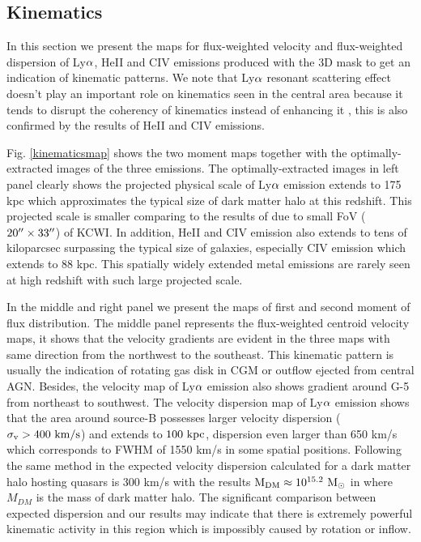 \subsection{Kinematics}

In this section we present the maps for flux-weighted velocity and flux-weighted dispersion of Ly$\rm \alpha$, HeII and CIV emissions produced with the 3D mask to get an indication of kinematic patterns. We note that Ly$\rm \alpha$ resonant scattering effect doesn't play an important role on kinematics seen in the central area because it tends to disrupt the coherency of kinematics instead of enhancing it \citep{Cantalupo2005Fluorescent}, this is also confirmed by the results of HeII and CIV emissions.

Fig. \ref{kinematicsmap} shows the two moment maps together with the optimally-extracted images of the three emissions. The optimally-extracted images in left panel clearly shows the projected physical scale of Ly$\rm \alpha$ emission extends to 175 kpc which approximates the typical size of dark matter halo at this redshift. This projected scale is smaller comparing to the results of \citet{cai2017discovery} due to small FoV ($\rm 20\mbox{$^{\prime\prime}$} \times 33\mbox{$^{\prime\prime}$}$) of KCWI. In addition, HeII and CIV emission also extends to tens of kiloparcsec surpassing the typical size of galaxies, especially CIV emission which extends to 88 kpc. This spatially widely extended metal emissions are rarely seen at high redshift with such large projected scale.

In the middle and right panel we present the maps of first and second moment of flux distribution. The middle panel represents the flux-weighted centroid velocity maps, it shows that the velocity gradients are evident in the three maps with same direction from the northwest to the southeast. This kinematic pattern is usually the indication of rotating gas disk in CGM or outflow ejected from central AGN. Besides, the velocity map of Ly$\rm \alpha$ emission also shows gradient around G-5 from northeast to southwest.  The velocity dispersion map of Ly$\rm \alpha$ emission shows that the area around source-B possesses larger velocity dispersion ($\rm \sigma_{v} > 400 \ km/s$) and extends to $\rm 100 \ kpc$, dispersion even larger than 650 km/s which corresponds to FWHM of 1550 km/s in some spatial positions. Following the same method in \citet{Arrigoni_Battaia_2018} the expected velocity dispersion calculated for a dark matter halo hosting quasars is 300 km/s with the results $\rm M_{DM} \approx 10^{15.2} \ M_{\odot}$ in \citet{arrigoni2018overdensity} where $M_{DM}$ is the mass of dark matter halo. The significant comparison between expected dispersion and our results may indicate that there is extremely powerful kinematic activity in this region which is impossibly caused by rotation or inflow.

